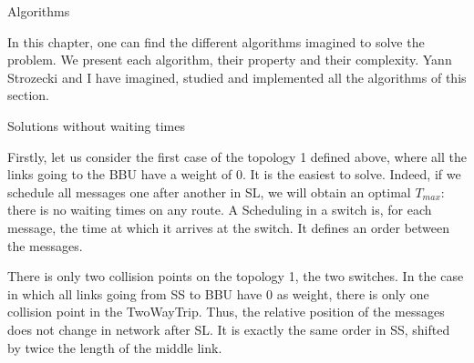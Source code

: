 \documentclass[a4paper,10pt]{report}
\begin{document}
\begin{chapter}{Algorithms}

In this chapter, one can find the different algorithms imagined to solve the problem. We present each algorithm, their property and their complexity.
Yann Strozecki and I have imagined, studied and implemented all the algorithms of this section.

\begin{section}{Solutions without waiting times}

Firstly, let us consider the first case of the topology 1 defined above, where all the links going to the BBU
have a weight of 0. It is the easiest to solve. 
Indeed, if we schedule all messages one after another in SL, we will obtain an optimal
$T_{max}$: there is no waiting times on any route.
A Scheduling in a switch is, for each message, the time at which it arrives at the switch. It defines an order between the messages.

There is only two collision points on the topology 1, the two switches. 
In the case in which all links going from SS to BBU have 0 as weight, there is only one collision point in the TwoWayTrip.
Thus, the relative position of the messages does not change in network after SL. It is exactly the same order in SS, shifted by twice the length of the middle link.
\\
\begin{center}
\end{center}
\end{section}
\end{chapter}
\end{document}
